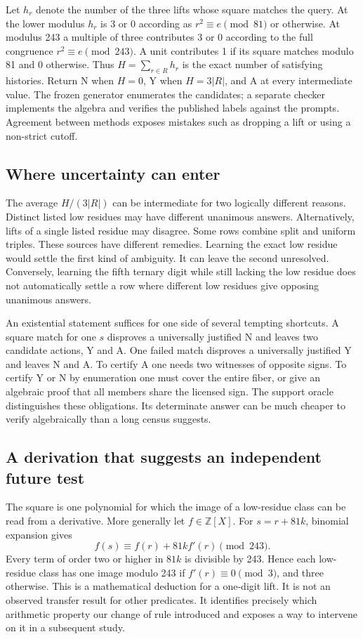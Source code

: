 \documentclass[12pt,letterpaper]{article}
\begin{document}
Let $h_r$ denote the number of the three lifts whose square matches the query. At the lower modulus $h_r$ is 3 or 0 according as $r^2\equiv e\pmod{81}$ or otherwise. At modulus 243 a multiple of three contributes 3 or 0 according to the full congruence $r^2\equiv e\pmod{243}$. A unit contributes 1 if its square matches modulo 81 and 0 otherwise. Thus $H=\sum_{r\in R}h_r$ is the exact number of satisfying histories. Return N when $H=0$, Y when $H=3|R|$, and A at every intermediate value. The frozen generator enumerates the candidates; a separate checker implements the algebra and verifies the published labels against the prompts. Agreement between methods exposes mistakes such as dropping a lift or using a non-strict cutoff.

\subsection{Where uncertainty can enter}
The average $H/(3|R|)$ can be intermediate for two logically different reasons. Distinct listed low residues may have different unanimous answers. Alternatively, lifts of a single listed residue may disagree. Some rows combine split and uniform triples. These sources have different remedies. Learning the exact low residue would settle the first kind of ambiguity. It can leave the second unresolved. Conversely, learning the fifth ternary digit while still lacking the low residue does not automatically settle a row where different low residues give opposing unanimous answers.

An existential statement suffices for one side of several tempting shortcuts. A square match for one $s$ disproves a universally justified N and leaves two candidate actions, Y and A. One failed match disproves a universally justified Y and leaves N and A. To certify A one needs two witnesses of opposite signs. To certify Y or N by enumeration one must cover the entire fiber, or give an algebraic proof that all members share the licensed sign. The support oracle distinguishes these obligations. Its determinate answer can be much cheaper to verify algebraically than a long census suggests.

\subsection{A derivation that suggests an independent future test}
The square is one polynomial for which the image of a low-residue class can be read from a derivative. More generally let $f\in\mathbb Z[X]$. For $s=r+81k$, binomial expansion gives
\[
 f(s)\equiv f(r)+81k f'(r)\pmod{243}.
\]
Every term of order two or higher in $81k$ is divisible by 243. Hence each low-residue class has one image modulo 243 if $f'(r)\equiv0\pmod3$, and three otherwise. This is a mathematical deduction for a one-digit lift. It is not an observed transfer result for other predicates. It identifies precisely which arithmetic property our change of rule introduced and exposes a way to intervene on it in a subsequent study.
\end{document}

